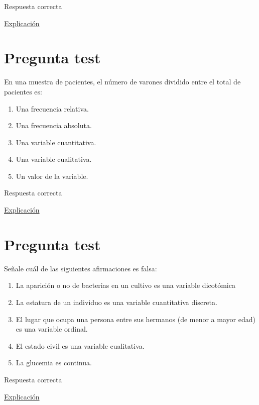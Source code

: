 \documentclass[
]{book}
\providecommand{\tightlist}{%
  \setlength{\itemsep}{0pt}\setlength{\parskip}{0pt}}
\begin{document}
Respuesta correcta

\href{https://escuelitamedica.com/2019/02/03/tipos-de-estudios-epidemiologicos-preguntas/}{Explicación}

\hypertarget{pregunta-test-2}{%
\section{Pregunta test}\label{pregunta-test-2}}

En una muestra de pacientes, el número de varones dividido entre el total de pacientes es:

\begin{enumerate}
\def\labelenumi{\alph{enumi})}
\tightlist
\item
  Una frecuencia relativa.
\item
  Una frecuencia absoluta.
\item
  Una variable cuantitativa.
\item
  Una variable cualitativa.
\item
  Un valor de la variable.
\end{enumerate}

Respuesta correcta

\href{https://1fjmanzano.github.io/bioestadistica/tablas-de-frecuencias.html}{Explicación}

\hypertarget{pregunta-test-3}{%
\section{Pregunta test}\label{pregunta-test-3}}

Señale cuál de las siguientes afirmaciones es falsa:

\begin{enumerate}
\def\labelenumi{\alph{enumi})}
\tightlist
\item
  La aparición o no de bacterias en un cultivo es una variable dicotómica
\item
  La estatura de un individuo es una variable cuantitativa discreta.
\item
  El lugar que ocupa una persona entre sus hermanos (de menor a mayor edad) es una variable ordinal.
\item
  El estado civil es una variable cualitativa.
\item
  La glucemia es continua.
\end{enumerate}

Respuesta correcta

\href{https://1fjmanzano.github.io/bioestadistica/tipos-de-variables.html}{Explicación}
\end{document}
